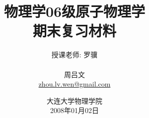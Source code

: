 \documentclass[a4paper,titlepage]{caspset}
\begin{document}
\title{物理学06级原子物理学\\期末复习材料
 \vspace{-20pt}}
\author{{\Large 授课老师: 罗骥}\\ \vspace{50pt}\\ 周吕文\\ \href{mailto:zhou.lv.wen@gmail.com}{zhou.lv.wen@gmail.com}\\ \vspace{50pt}}
\date{大连大学物理学院\\2008年01月02日}
\maketitle

\tableofcontents


\newpage


\newpage

\newpage

\newpage

\newpage

\newpage






\end{document}

